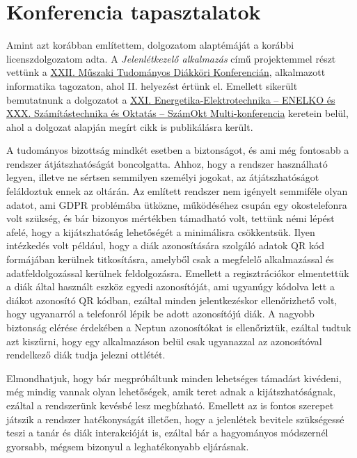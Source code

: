 \chapter{Konferencia tapasztalatok} \label{chapter4}

Amint azt korábban említettem, dolgozatom alaptémáját a korábbi licenszdolgozatom adta. A \textit{Jelenlétkezelő alkalmazás} című projektemmel részt vettünk a 
\href{https://mtdk.tmd.ro/index.php/site/page/?p=21}{XXII. Műszaki Tudományos Diákköri Konferencián}, alkalmazott informatika tagozaton, ahol II. helyezést értünk el. Emellett sikerült bemutatnunk a dolgozatot a \href{https://ojs.emt.ro/enelko-szamokt/article/view/327/266}{XXI. Energetika-Elektrotechnika – ENELKO és XXX. Számítástechnika és Oktatás – SzámOkt Multi-konferencia} keretein belül, ahol a dolgozat alapján megírt cikk is publikálásra került.

A tudományos bizottság mindkét esetben a biztonságot, és ami még fontosabb a rendszer átjátszhatóságát boncolgatta. Ahhoz, hogy a rendszer használható legyen, illetve ne sértsen semmilyen személyi jogokat, az átjátszhatóságot feláldoztuk ennek az oltárán. Az említett rendszer nem igényelt semmiféle olyan adatot, ami GDPR problémába ütközne, működéséhez csupán egy okostelefonra volt szükség, és bár bizonyos mértékben támadható volt, tettünk némi lépést afelé, hogy a kijátszhatóság lehetőségét a minimálisra csökkentsük. Ilyen intézkedés volt például, hogy a diák azonosítására szolgáló adatok QR kód formájában kerülnek titkosításra, amelyből csak a megfelelő alkalmazással és adatfeldolgozással kerülnek feldolgozásra. Emellett a regisztrációkor elmentettük a diák által használt eszköz egyedi azonosítóját, ami ugyanúgy kódolva lett a diákot azonosító QR kódban, ezáltal minden jelentkezéskor ellenőrizhető volt, hogy ugyanarról a telefonról lépik be adott azonosítójú diák. A nagyobb biztonság elérése érdekében a Neptun azonosítókat is ellenőriztük, ezáltal tudtuk azt kiszűrni, hogy egy alkalmazáson belül csak ugyanazzal az azonosítóval rendelkező diák tudja jelezni ottlétét.

Elmondhatjuk, hogy bár megpróbáltunk minden lehetséges támadást kivédeni, még mindig vannak olyan lehetőségek, amik teret adnak a kijátszhatóságnak, ezáltal a rendszerünk kevésbé lesz megbízható. Emellett az is fontos szerepet játszik a rendszer hatékonyságát illetően, hogy a jelenlétek bevitele szükségessé teszi a tanár és diák interakcióját is, ezáltal bár a hagyományos módszernél gyorsabb, mégsem bizonyul a leghatékonyabb eljárásnak.

